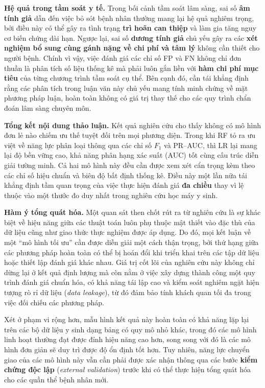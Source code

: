 \documentclass[14pt,a4paper]{extreport}
\begin{document}
\textbf{Hệ quả trong tầm soát y tế.} Trong bối cảnh tầm soát lâm sàng, sai số \textbf{âm tính giả} dẫn đến việc bỏ sót bệnh nhân thường mang lại hệ quả nghiêm trọng, bởi điều này có thể gây ra tình trạng \textbf{trì hoãn can thiệp} và làm gia tăng nguy cơ biến chứng dài hạn. Ngược lại, sai số \textbf{dương tính giả} chủ yếu gây ra các \textbf{xét nghiệm bổ sung cùng gánh nặng về chi phí và tâm lý} không cần thiết cho người bệnh. Chính vì vậy, việc đánh giá các chỉ số FP và FN không chỉ đơn thuần là phân tích số liệu thống kê mà phải luôn gắn liền với \textbf{hàm chi phí mục tiêu} của từng chương trình tầm soát cụ thể. Bên cạnh đó, cần tái khẳng định rằng các phân tích trong luận văn này chủ yếu mang tính minh chứng về mặt phương pháp luận, hoàn toàn không có giá trị thay thế cho các quy trình chẩn đoán lâm sàng chuyên môn.

\textbf{Tổng kết nội dung thảo luận.} Kết quả nghiên cứu cho thấy không có mô hình đơn lẻ nào chiếm ưu thế tuyệt đối trên mọi phương diện. Trong khi RF tỏ ra ưu việt về năng lực phân loại thông qua các chỉ số $F_1$ và PR--AUC, thì LR lại mang lại độ bền vững cao, khả năng phân hạng xác suất (AUC) tốt cùng cấu trúc diễn giải tường minh. Cả hai mô hình này đều cần được xem xét cẩn trọng kèm theo các chỉ số hiệu chuẩn và biên độ bất định thống kê. Điều này một lần nữa tái khẳng định tầm quan trọng của việc thực hiện đánh giá \textbf{đa chiều} thay vì lệ thuộc vào một thước đo duy nhất trong nghiên cứu học máy y sinh.

\textbf{Hàm ý tổng quát hóa.} Một quan sát then chốt rút ra từ nghiên cứu là sự khác biệt về hiệu năng giữa các thuật toán luôn phụ thuộc mật thiết vào đặc thù của dữ liệu cũng như giao thức thực nghiệm được áp dụng. Do đó, mọi kết luận về một ``mô hình tối ưu'' cần được diễn giải một cách thận trọng, bởi thứ hạng giữa các phương pháp hoàn toàn có thể bị hoán đổi khi triển khai trên các tập dữ liệu hoặc thiết lập đánh giá khác nhau. Giá trị cốt lõi của nghiên cứu này không chỉ dừng lại ở kết quả định lượng mà còn nằm ở việc xây dựng thành công một quy trình đánh giá chuẩn hóa, có khả năng tái lập cao và kiểm soát nghiêm ngặt hiện tượng rò rỉ dữ liệu (\textit{data leakage}), từ đó đảm bảo tính khách quan tối đa trong việc đối chiếu các phương pháp.

Xét ở phạm vi rộng hơn, mẫu hình kết quả này hoàn toàn có khả năng lặp lại trên các bộ dữ liệu y sinh dạng bảng có quy mô nhỏ khác, trong đó các mô hình linh hoạt thường đạt được đỉnh hiệu năng cao hơn, song song với đó là các mô hình đơn giản sẽ duy trì được độ ổn định tốt hơn. Tuy nhiên, năng lực chuyển giao của các mô hình này vẫn cần phải được xác nhận thông qua các bước \textbf{kiểm chứng độc lập} (\textit{external validation}) trước khi có thể thực hiện tổng quát hóa cho các quần thể bệnh nhân mới.
\end{document}
